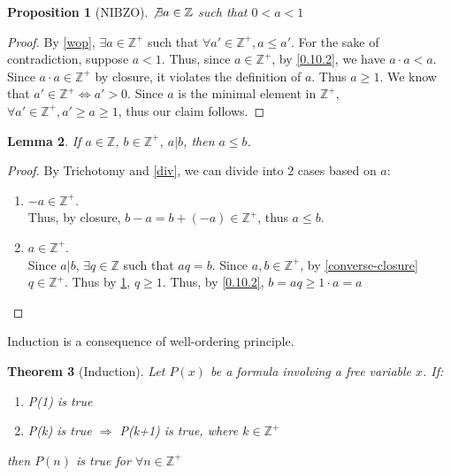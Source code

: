 \documentclass{article}
\newcommand{\Z}{\mathbb{Z}}
\newcommand{\FTSOC}{For the sake of contradiction}
\newcommand{\st}{such that }
\newtheorem{thm}{Theorem}[section]
\newtheorem{lem}[thm]{Lemma}
\newtheorem{prop}[thm]{Proposition}
\begin{document}
\begin{prop}[NIBZO]
\label{nibzo}
$\not\exists a\in \Z$ \st $0<a<1$
\end{prop}
\begin{proof}
By \ref{wop}, $\exists a \in \Z^{+}$ \st $\forall a' \in \Z^{+}, a\leq a'$. \FTSOC, suppose $a<1$. Thus, since $a\in \Z^{+}$, by \ref{0.10.2}, we have $a\cdot a <a$. Since  $a\cdot a\in \Z^{+}$ by closure, it violates the definition of $a$. Thus $a \geq 1$. We know that $a'\in \Z^{+} \iff a' >0$. Since $a$ is the minimal element in $\Z^{+}$, $\forall a' \in \Z^{+}, a'\geq a\geq 1$, thus our claim follows. 
\end{proof}

\begin{lem}
\label{1.12}
If $a\in \Z$, $b \in \Z^{+}$, $a|b$, then $a\leq b$. 
\end{lem}

\begin{proof}
By Trichotomy and \ref{div}, we can divide into 2 cases based on $a$:
\begin{enumerate}
    \item $-a\in \Z^{+}$.\\
    Thus, by closure, $b-a=b+(-a)\in \Z^{+}$, thus $a\leq b$. 
    \item $a\in \Z^{+}$.\\
    Since $a|b$, $\exists q \in \Z$ \st $aq=b$. Since $a,b\in \Z^{+}$, by \ref{converse-closure} $q\in \Z^{+}$. Thus by \ref{nibzo}, $q\geq 1$. Thus, by \ref{0.10.2}, $b=aq\geq 1\cdot a=a$
\end{enumerate}
\end{proof}

Induction is a consequence of well-ordering principle. 

\begin{thm}[Induction]
\label{induction}
Let $P(x)$ be a formula involving a free variable $x$. If: 
\begin{enumerate}
    \item P(1) is true
    \item P(k) is true $\Rightarrow$ P(k+1) is true, where $k\in \Z^{+}$
\end{enumerate}
then $P(n)$ is true for $\forall n\in \Z^{+}$
\end{thm}
\end{document}
